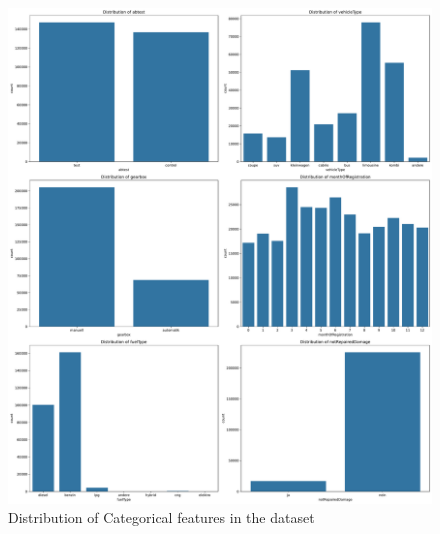 \documentclass[conference]{IEEEtran}
\begin{document}
\begin{figure}[H]
\centering
\includegraphics[width=\linewidth]{figures/cat_features_distribution.pdf}
\caption{Distribution of Categorical features in the dataset}
\label{fig:cat_features_dist}
\end{figure}
\end{document}
